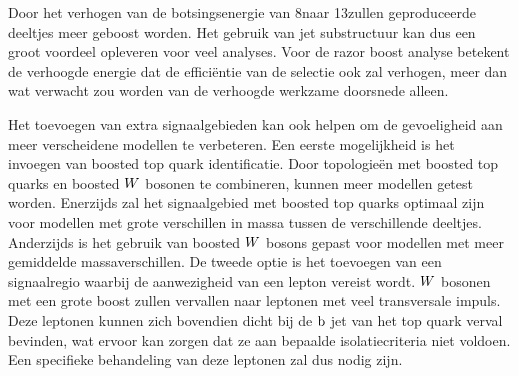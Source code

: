 Door het verhogen van de botsingsenergie van 8\TeV naar 13\TeV zullen geproduceerde deeltjes meer
geboost worden. Het gebruik van jet substructuur kan dus een groot voordeel opleveren voor veel
analyses. Voor de razor boost analyse betekent de verhoogde energie dat de effici\"entie van de
selectie ook zal verhogen, meer dan wat verwacht zou worden van de verhoogde werkzame doorsnede
alleen. 

Het toevoegen van extra signaalgebieden kan ook helpen om de gevoeligheid aan meer verscheidene
modellen te verbeteren. Een eerste mogelijkheid is het invoegen van boosted top quark
identificatie. Door topologie\"en met boosted top quarks en boosted $W$ bosonen te combineren,
kunnen meer modellen getest worden. Enerzijds zal het signaalgebied met boosted top quarks
optimaal zijn voor modellen met grote verschillen in massa tussen de verschillende deeltjes. 
Anderzijds is het gebruik van boosted $W$ bosons gepast voor modellen met meer gemiddelde
massaverschillen. 
De tweede optie is het toevoegen van een signaalregio waarbij de aanwezigheid van een lepton
vereist wordt. $W$ bosonen met een grote boost zullen vervallen naar leptonen met veel transversale
impuls. Deze leptonen kunnen zich bovendien dicht bij de $\mathrm{b}$ jet van het top quark verval
bevinden, wat ervoor kan zorgen dat ze aan bepaalde isolatiecriteria niet voldoen. Een specifieke
behandeling van deze leptonen zal dus nodig zijn. 

